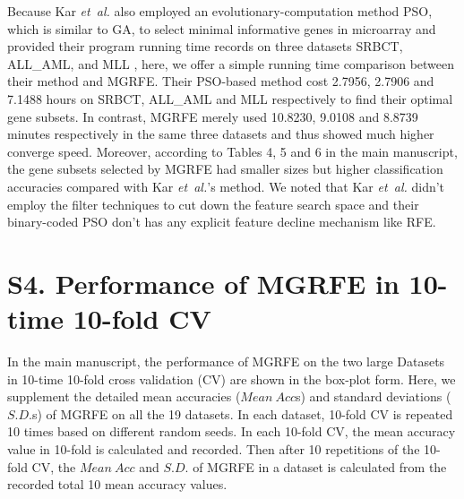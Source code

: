 \documentclass[10pt,journal,compsoc]{IEEEtran}
\begin{document}
	Because Kar \emph{et~al.} also employed an evolutionary-computation method PSO, which is similar to GA, to select minimal informative genes in microarray and provided their program running time records on three datasets SRBCT, ALL\_AML, and MLL \cite{W15}, here, we offer a simple running time comparison between their method and MGRFE. Their PSO-based method cost 2.7956, 2.7906 and 7.1488 hours on SRBCT, ALL\_AML and MLL respectively to find their optimal gene subsets. In contrast, MGRFE merely used 10.8230, 9.0108 and 8.8739 minutes respectively in the same three datasets and thus showed much higher converge speed. Moreover, according to Tables 4, 5 and 6 in the main manuscript, the gene subsets selected by MGRFE had smaller sizes but higher classification accuracies compared with Kar \emph{et~al.}'s method. We noted that Kar \emph{et~al.} didn't employ the filter techniques to cut down the feature search space and their binary-coded PSO don't has any explicit feature decline mechanism like RFE.


	\section*{S4. Performance of MGRFE in 10-time 10-fold CV}

	In the main manuscript, the performance of MGRFE on the two large Datasets in 10-time 10-fold cross validation (CV) are shown in the box-plot form. Here, we supplement the detailed mean accuracies ($Mean~Acc$s) and standard deviations ($S.D.$s) of MGRFE on all the 19 datasets. In each dataset, 10-fold CV is repeated 10 times based on different random seeds. In each 10-fold CV, the mean accuracy value in 10-fold is calculated and recorded. Then after 10 repetitions of the 10-fold CV, the $Mean~Acc$ and $S.D.$ of MGRFE in a dataset is calculated from the recorded total 10 mean accuracy values.
	
\end{document}
